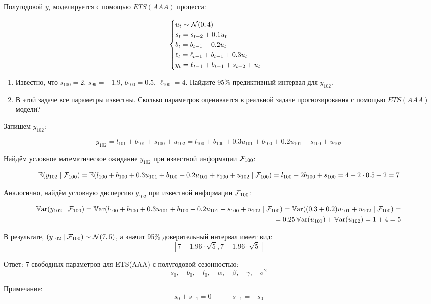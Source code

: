 \begin{problem}
Полугодовой $y_t$ моделируется с помощью $ETS(AAA)$ процесса:
    
\[
\begin{cases}
    u_t \sim \mathcal{N}(0; 4) \\
    s_t = s_{t-2} + 0.1 u_t \\
    b_t = b_{t-1} + 0.2 u_t \\
    \ell_t = \ell_{t-1} + b_{t-1} + 0.3 u_t \\
    y_t = \ell_{t-1} + b_{t-1} + s_{t-2} + u_t \\
\end{cases}    
\]

\begin{enumerate}
    \item Известно, что $s_{100} = 2$, $s_{99} = -1.9$, $b_{100} = 0.5$, $\ell_{100} = 4$. Найдите 95\% предиктивный интервал для $y_{102}$. 
    \item В этой задаче все параметры известны. Сколько параметров оценивается в реальной задаче прогнозирования с помощью $ETS(AAA)$ модели?
\end{enumerate}
\begin{sol}

  Запишем $y_{102}$:

  \[
  y_{102} = l_{101} + b_{101} + s_{100} + u_{102} = l_{100} + b_{100} + 0.3 u_{101} + b_{100} + 0.2 u_{101} + s_{100} + u_{102}
  \]
  
  Найдём условное математическое ожидание $y_{102}$ при известной информации $\mathcal{F}_{100}$:
  
  \[
  \operatorname{\mathbb{E}}(y_{102}\mid \mathcal{F}_{100}) = \operatorname{\mathbb{E}}(l_{100} + b_{100} + 0.3 u_{101} + b_{100} + 0.2 u_{101} + s_{100} + u_{102}\mid \mathcal{F}_{100}) = l_{100} + 2 b_{100} + s_{100} = 4 + 2 \cdot 0.5 + 2 = 7
  \]
  
  Аналогично, найдём условную дисперсию $y_{102}$ при известной информации $\mathcal{F}_{100}$:
  
  \begin{align*}  
  \operatorname{\mathbb{V}\mathrm{ar}}(y_{102}\mid \mathcal{F}_{100}) = \operatorname{\mathbb{V}\mathrm{ar}}(l_{100} + b_{100} + 0.3 u_{101} + b_{100} + 0.2 u_{101} + s_{100} + u_{102}\mid \mathcal{F}_{100}) = \operatorname{\mathbb{V}\mathrm{ar}}((0.3+0.2)u_{101} + u_{102}\mid \mathcal{F}_{100}) =\\
   = 0.25 \operatorname{\mathbb{V}\mathrm{ar}}(u_{101}) + \operatorname{\mathbb{V}\mathrm{ar}}(u_{102}) = 1 + 4 = 5
\end{align*}
  
  В результате, $(y_{102} \mid \mathcal{F}_{100}) \sim \mathcal{N}(7, 5)$, а значит 95\% доверительный интервал имеет вид:
  \[
  \left[7 - 1.96 \cdot \sqrt{5}, 7 + 1.96 \cdot \sqrt{5} \right]
  \]
  
  Ответ: 7 свободных параметров для ETS(AAA) с полугодовой сезонностью:
  \[
  s_0, \quad b_0,  \quad l_0, \quad \alpha, \quad \beta, \quad \gamma, \quad \sigma^2
  \]
  
  Примечание: 
  \[
  s_0 + s_{-1} = 0 \quad \quad \quad  s_{-1} = - s_{0}
  \]

\end{sol}
\end{problem}

